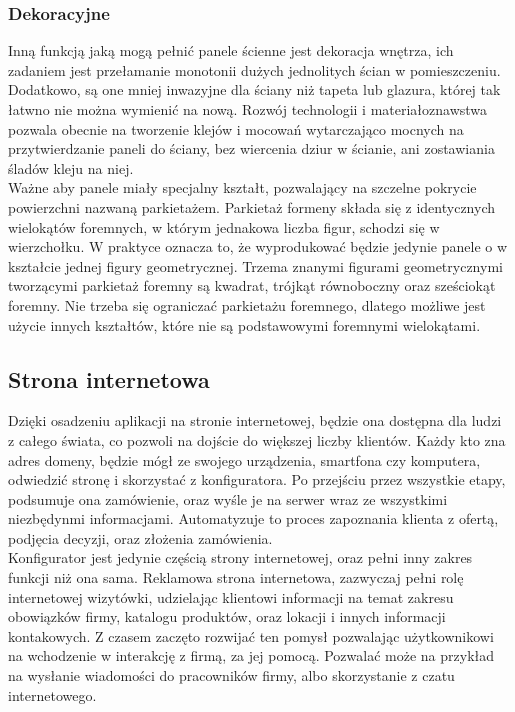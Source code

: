 \documentclass{article} %
\begin{document}
        \subsubsection{Dekoracyjne}
        Inną funkcją jaką mogą pełnić panele ścienne jest dekoracja wnętrza, ich zadaniem jest przełamanie monotonii dużych jednolitych ścian w pomieszczeniu. Dodatkowo, są one mniej inwazyjne dla ściany niż tapeta lub glazura, której tak łatwno nie można wymienić na nową. Rozwój technologii i materiałoznawstwa pozwala obecnie na tworzenie klejów i mocowań wytarczająco mocnych na przytwierdzanie paneli do ściany, bez wiercenia dziur w ścianie, ani zostawiania śladów kleju na niej.
        \\
        
        Ważne aby panele miały specjalny kształt, pozwalający na szczelne pokrycie powierzchni nazwaną parkietażem. Parkietaż formeny składa się z identycznych wielokątów foremnych, w którym jednakowa liczba figur, schodzi się w wierzchołku. W praktyce oznacza to, że wyprodukować będzie jedynie panele o w kształcie jednej figury geometrycznej. Trzema znanymi figurami geometrycznymi tworzącymi parkietaż foremny są kwadrat, trójkąt równoboczny oraz sześciokąt foremny. Nie trzeba się ograniczać parkietażu foremnego, dlatego możliwe jest użycie innych kształtów, które nie są podstawowymi foremnymi wielokątami.
        \\
    
    \subsection{Strona internetowa}
        Dzięki osadzeniu aplikacji na stronie internetowej, będzie ona dostępna dla ludzi z całego świata, co pozwoli na dojście do większej liczby klientów. Każdy kto zna adres domeny, będzie mógł ze swojego urządzenia, smartfona czy komputera, odwiedzić stronę i skorzystać z konfiguratora. Po przejściu przez wszystkie etapy, podsumuje ona zamówienie, oraz wyśle je na serwer wraz ze wszystkimi niezbędynmi informacjami. Automatyzuje to proces zapoznania klienta z ofertą, podjęcia decyzji, oraz złożenia zamówienia.
        \\
        
        Konfigurator jest jedynie częścią strony internetowej, oraz pełni inny zakres funkcji niż ona sama. Reklamowa strona internetowa, zazwyczaj pełni rolę internetowej wizytówki, udzielając klientowi informacji na temat zakresu obowiązków firmy, katalogu produktów, oraz lokacji i innych informacji kontakowych. Z czasem zaczęto rozwijać ten pomysł pozwalając użytkownikowi na wchodzenie w interakcję z firmą, za jej pomocą. Pozwalać może na przykład na wysłanie wiadomości do pracowników firmy, albo skorzystanie z czatu internetowego.
        \\
        
\end{document}
